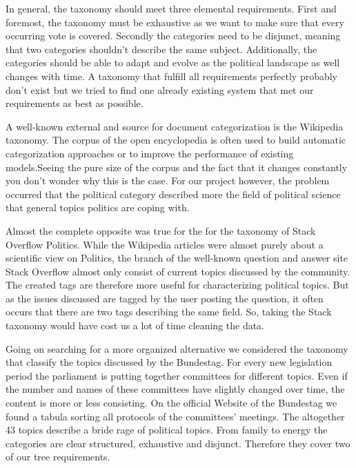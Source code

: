 In general, the taxonomy should meet three elemental requirements. First and foremost, the taxonomy must be exhaustive as we want to make sure that every occurring vote is covered. Secondly the categories need to be disjunct, meaning that two categories shouldn't describe the same subject. Additionally, the categories should be able to adapt and evolve as the political landscape as well changes with time. A taxonomy that fulfill all requirements perfectly probably don't exist but we tried to find one already existing system that met our requirements as best as possible.
% 
% 
% 
% 

A well-known external and source for document categorization is the Wikipedia taxonomy. The corpus of the open encyclopedia is often used to build automatic categorization approaches or to improve the performance of existing models.Seeing the pure size of the corpus and the fact that it changes constantly you don’t wonder why this is the case.  For our project however, the problem occurred that the political category described more the field of political science that general topics politics are coping with. 

Almost the complete opposite was true for the for the taxonomy of Stack Overflow Politics. While the Wikipedia articles were almost purely about a scientific view on Politics, the branch of the well-known question and answer site Stack Overflow almost only consist of current topics discussed by the community. The created tags are therefore more useful for characterizing political topics. But as the issues discussed are tagged by the user posting the question, it often occurs that there are two tags describing the same field. So, taking the Stack taxonomy would have cost us a lot of time cleaning the data. 


Going on searching for a more organized alternative we considered the taxonomy that classify the topics discussed by the Bundestag. For every new legislation period the parliament is putting together committees for different topics. Even if the number and names of these committees have slightly changed over time, the content is more or less consisting. On the official Website of the Bundestag we found a tabula sorting all protocols of the committees' meetings. The altogether 43 topics describe a bride rage of political topics. From family to energy the categories are clear structured, exhaustive and disjunct. Therefore they cover two of our tree requirements. 

